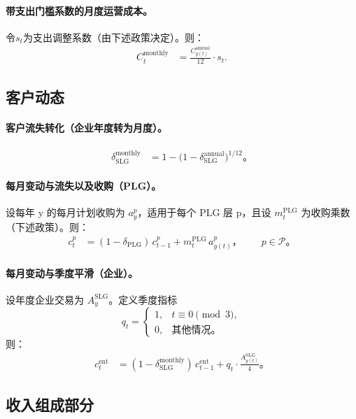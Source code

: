 \documentclass[11点, A4纸, 单面]{article}
\begin{document}
\paragraph{带支出门槛系数的月度运营成本。}
令$s_t$为支出调整系数（由下述政策决定）。则：
\begin{align}
C^{\mathrm{monthly}}_t 
  &= \frac{C^{\mathrm{annual}}_{y(t)}}{12} \cdot s_t.
\end{align}

\subsection{客户动态}
\paragraph{客户流失转化（企业年度转为月度）。}
\begin{align}
\delta^{\mathrm{monthly}}_{\mathrm{SLG}} 
  &= 1 - \bigl(1 - \delta^{\mathrm{annual}}_{\mathrm{SLG}}\bigr)^{1/12}。
\end{align}

\paragraph{每月变动与流失以及收购（PLG）。}
设每年 y 的每月计划收购为 $a^p_y$，适用于每个 PLG 层 p，且设 $m^{\mathrm{PLG}}_t$ 为收购乘数（下述政策）。则：
\begin{align}
c^p_t 
  &= (1-\delta_{\mathrm{PLG}})\, c^p_{t-1} + m^{\mathrm{PLG}}_t \, a^p_{y(t)}， 
  \qquad p \in \mathcal{P}。
\end{align}

\paragraph{每月变动与季度平滑（企业）。}
设年度企业交易为 $A^{\mathrm{SLG}}_{y}$。定义季度指标
\[
q_t = 
\begin{cases}
1, & t \equiv 0 \pmod{3},\\
0, & 其他情况。
\end{cases}
\]
则：
\begin{align}
c^{\mathrm{ent}}_t 
  &= (1-\delta^{\mathrm{monthly}}_{\mathrm{SLG}})\, c^{\mathrm{ent}}_{t-1}
     + q_t \cdot \frac{A^{\mathrm{SLG}}_{y(t)}}{4}。
\end{align}

\subsection{收入组成部分}
\end{document}
